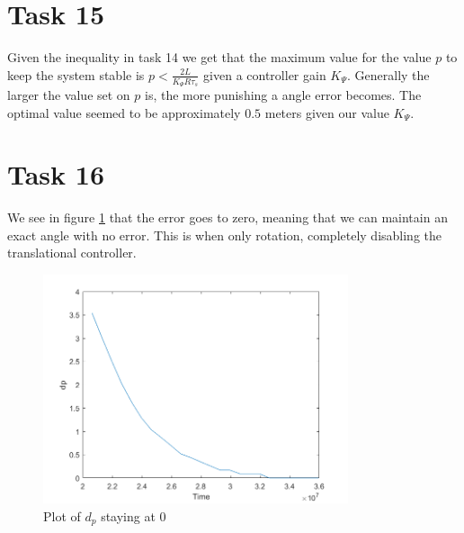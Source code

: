 \documentclass[a4paper,12pt,oneside,onecolumn]{article} %
\begin{document}
\section*{Task 15}

Given the inequality in task 14 we get that the maximum value for the value $p$ to keep the system stable is $p<\frac{2 L }{K_\Psi R \tau_s}$ given a controller gain $K_\Psi$. Generally the larger the value set on $p$ is, the more punishing a angle error becomes. The optimal value seemed to be approximately $0.5$ meters given our value $K_\Psi$.

\section*{Task 16}

We see in figure \ref{16} that the error goes to zero, meaning that we can maintain an exact angle with no error. This is when only rotation, completely disabling the translational controller. 


\begin{figure}[H]
\begin{center}	
  \includegraphics[width = 0.8\textwidth]{task16.png}
  \caption{Plot of $d_p$ staying at 0}\label{16}
 \end{center}
\end{figure}
\end{document}
